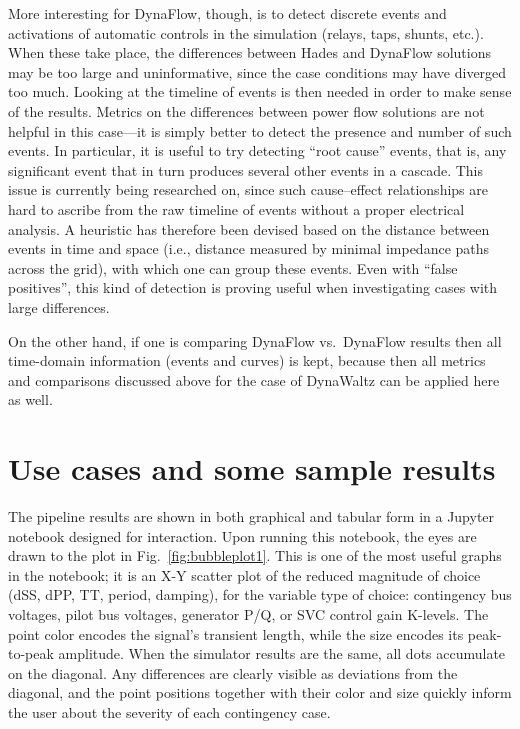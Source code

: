 \documentclass[conference]{IEEEtran}
\begin{document}
More interesting for DynaFlow, though, is to detect discrete events and
activations of automatic controls in the simulation (relays, taps, shunts,
etc.).  When these take place, the differences between Hades and DynaFlow
solutions may be too large and uninformative, since the case conditions may have
diverged too much.  Looking at the timeline of events is then needed in order to
make sense of the results.  Metrics on the differences between power flow
solutions are not helpful in this case---it is simply better to detect the
presence and number of such events.  In particular, it is useful to try
detecting ``root cause'' events, that is, any significant event that in turn
produces several other events in a cascade. This issue is currently being researched on, since such cause--effect relationships are hard to ascribe from the
raw timeline of events without a proper electrical analysis. A heuristic has therefore been
devised based on the distance between events in time and space
(i.e., distance measured by minimal impedance paths across the grid), with which
one can group these events.  Even with ``false positives'', this kind of
detection is proving useful when investigating cases with large differences.

On the other hand, if one is comparing DynaFlow vs.\ DynaFlow results then all
time-domain information (events and curves) is kept, because then all metrics
and comparisons discussed above for the case of DynaWaltz can be applied here as
well.




\section{Use cases and some sample results}

The pipeline results are shown in both graphical and tabular form in a Jupyter
notebook designed for interaction.  Upon running this notebook, the eyes are
drawn to the plot in Fig.~\ref{fig:bubbleplot1}.  This is one of the most useful
graphs in the notebook; it is an X-Y scatter plot of the reduced magnitude of
choice (dSS, dPP, TT, period, damping), for the variable type of choice:
contingency bus voltages, pilot bus voltages, generator P/Q, or SVC control gain
K-levels. The point color encodes the signal's transient length, while the size
encodes its peak-to-peak amplitude.  When the simulator results are the same,
all dots accumulate on the diagonal. Any differences are clearly visible as
deviations from the diagonal, and the point positions together with their color
and size quickly inform the user about the severity of each contingency case.
\end{document}
